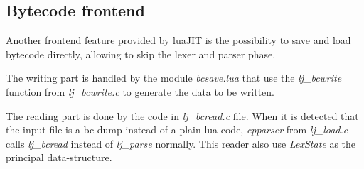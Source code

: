 
\subsection{Bytecode frontend}
\label{Subsec:bc-frontend}

Another frontend feature provided by luaJIT is the possibility to save and load
bytecode directly, allowing to skip the lexer and parser phase.

The writing part is handled by the module \emph{bcsave.lua} that use the
\emph{lj\_bcwrite} function from \emph{lj\_bcwrite.c} to generate the data to be written.

The reading part is done by the code in \emph{lj\_bcread.c} file. When it is
detected that the input file is a bc dump instead of a plain lua code,
\emph{cpparser} from \emph{lj\_load.c} calls \emph{lj\_bcread} instead of
\emph{lj\_parse} normally. This reader also use \emph{LexState} as the principal
data-structure.

